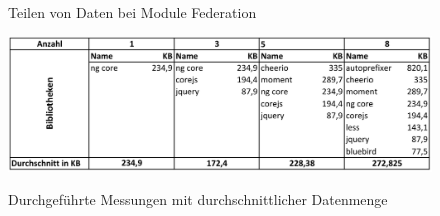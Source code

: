 \begin{figure}[hbt!]
	\centering
	\begin{minipage}[t]{0.8\textwidth}	
		\caption{Teilen von Daten bei Module Federation}
		\\ %
		\label{fig:ModuleFShareData}
	\end{minipage}
\end{figure}

\newpage
\begin{figure}[hbt!]
	\centering
	\begin{minipage}[t]{1\textwidth}	
		\caption{Durchgeführte Messungen mit durchschnittlicher Datenmenge}
		\includegraphics[width=1\textwidth]{img/appendix/DatasizeEval/GGBibliothekenMessungen.pdf}\\ %
		\label{fig:GGMessungBibs}
	\end{minipage}
\end{figure}

